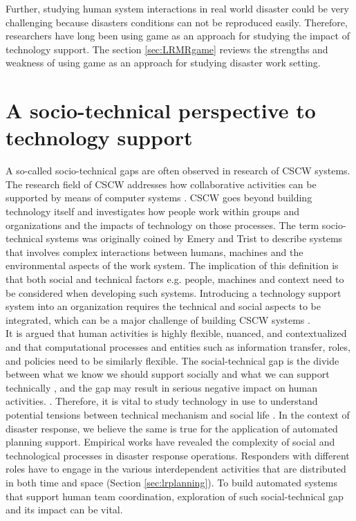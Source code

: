 Further, studying human system interactions in real world disaster could be very challenging because disasters conditions can not be reproduced easily. Therefore, researchers have long been using game as an approach for studying the impact of technology support.  The section \ref{sec:LRMRgame} reviews the strengths and weakness of using game as an approach for studying disaster work setting. \\


\section{A socio-technical perspective to technology support} \label{sec:LRSocialTechnical}

A so-called socio-technical gaps are often observed in research of \acf{CSCW} systems. The research field of \ac{CSCW} addresses how collaborative activities can be supported by means of computer systems \cite{Carstensen1999}.  \ac{CSCW} goes beyond building technology itself and investigates how people work within groups and organizations and the impacts of technology on those processes. The term socio-technical systems was originally coined by Emery and Trist \cite{Ropohl1999} to describe systems that involves complex interactions between humans, machines and the environmental aspects of the work system. The implication of this definition is that both social and technical factors e.g. people, machines and context need to be considered when developing such systems. Introducing a technology support system into an organization requires the technical and social aspects to be integrated, which can be a major challenge of building \ac{CSCW} systems \cite{Ackerman2000}. \\

It is argued that \cite{Ackerman2000}  human activities is highly flexible, nuanced, and contextualized and that computational processes and entities such as information transfer, roles, and policies need to be similarly flexible. The social-technical gap is the divide between what we know we should support socially and what we can support technically \cite{Ackerman2000}, and the gap may result in serious negative impact on human activities. \cite{Bowers1994,Abbott1994a}. Therefore, it is vital to study technology in use to understand potential tensions between technical mechanism and social life \cite{Bowers1994}.  In the context of disaster response, we believe the same is true for the application of automated planning support. Empirical works \cite{Kopena2008,Fischer2015,Zerger2003} have revealed the complexity of social and technological processes in disaster response operations. Responders with different roles have to engage in the various interdependent activities that are distributed in both time and space (Section \ref{sec:lrplanning}). To build automated systems that support human team coordination, exploration of such social-technical gap and its impact can be vital. \\ 

